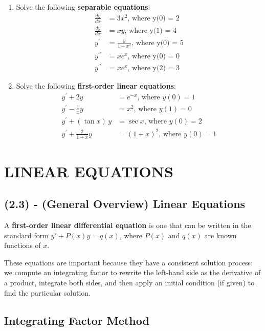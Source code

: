 \documentclass[11pt]{article}
\begin{document}
\begin{enumerate}
  \item Solve the following \textbf{separable equations}:
  \begin{align}
    \frac{dy}{dx} &= 3x^{2} \text{, where y(0) = 2}\\
    \frac{dy}{dx}  &= xy \text{, where y(1) = 4}\\
    y^{\prime} &= \frac{y}{1+x^{2}} \text{, where y(0) = 5}\\
    y^{\prime\prime} &= xe^{x} \text{, where y(0) = 0} \\
    y^{\prime\prime} &= xe^{x} \text{, where y(2) = 3}
  \end{align}

  \item Solve the following \textbf{first-order linear equations}:
  \begin{align}
    y^{\prime} + 2y &= e^{-x} \text{, where } y(0) = 1\\
    y^{\prime} - \frac{1}{x}y &= x^{2} \text{, where } y(1) = 0\\
    y^{\prime} + (\tan x)\,y &= \sec x \text{, where } y(0) = 2\\
    y^{\prime} + \frac{2}{1+x}y &= (1+x)^{2} \text{, where } y(0) = 1
  \end{align}
\end{enumerate}

\newpage
\section{LINEAR EQUATIONS}
\subsection{(2.3) - (General Overview) Linear Equations}
A \textbf{first-order linear differential equation} is one that can be written in the standard form $y' + P(x)y = q(x)$, where $P(x)$ and $q(x)$ are known functions of $x$. 

These equations are important because they have a consistent solution process: we compute an integrating factor to rewrite the left-hand side as the derivative of a product, 
integrate both sides, and then apply an initial condition (if given) to find the particular solution.

\subsection{Integrating Factor Method}
\end{document}
